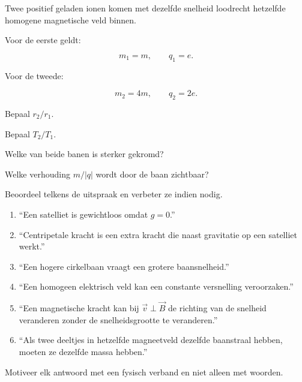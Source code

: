 \documentclass{ximera}
\begin{document}
\begin{oefening}{\oefG}

Twee positief geladen ionen komen met dezelfde snelheid loodrecht
hetzelfde homogene magnetische veld binnen.

Voor de eerste geldt:

\[
m_1=m,\qquad q_1=e.
\]

Voor de tweede:

\[
m_2=4m,\qquad q_2=2e.
\]

\begin{question}
Bepaal $r_2/r_1$.
\end{question}

\begin{question}
Bepaal $T_2/T_1$.
\end{question}

\begin{question}
Welke van beide banen is sterker gekromd?
\end{question}

\begin{question}
Welke verhouding $m/|q|$ wordt door de baan zichtbaar?
\end{question}

\end{oefening}


\begin{oefening}{\oefU\ESS}

Beoordeel telkens de uitspraak en verbeter ze indien nodig.

\begin{enumerate}
  \item ``Een satelliet is gewichtloos omdat $g=0$.''
  \item ``Centripetale kracht is een extra kracht die naast gravitatie
        op een satelliet werkt.''
  \item ``Een hogere cirkelbaan vraagt een grotere baansnelheid.''
  \item ``Een homogeen elektrisch veld kan een constante versnelling
        veroorzaken.''
  \item ``Een magnetische kracht kan bij $\vec v\perp\vec B$ de richting
        van de snelheid veranderen zonder de snelheidsgrootte te veranderen.''
  \item ``Als twee deeltjes in hetzelfde magneetveld dezelfde baanstraal
        hebben, moeten ze dezelfde massa hebben.''
\end{enumerate}

Motiveer elk antwoord met een fysisch verband en niet alleen met woorden.

\end{oefening}
\end{document}
